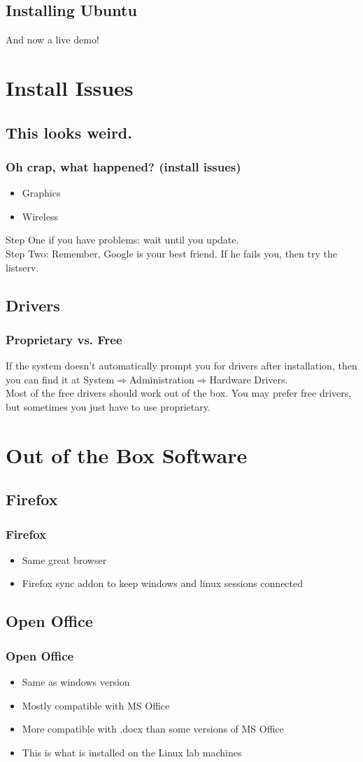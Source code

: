 \documentclass[hyperref={pdfpagelabels=false}]{beamer}
\begin{document}
\subsection{Installing Ubuntu}
\frame
{
	And now a live demo!
}
\section{Install Issues}
\subsection{This looks weird.}
\frame
{
	\frametitle{Oh crap, what happened? (install issues)}
	\begin{itemize}
	\item{Graphics}
	\item{Wireless}
	\end{itemize}
	Step One if you have problems: wait until you update.\\
	Step Two: Remember, Google is your best friend. If he fails you, then try the listserv.
}
\subsection{Drivers}
\frame
{
	\frametitle{Proprietary vs. Free}
	If the system doesn't automatically prompt you for drivers after installation, then you can find it at System$\Rightarrow$Administration$\Rightarrow$Hardware Drivers. \\
	Most of the free drivers should work out of the box. You may prefer free drivers, but sometimes you just have to use proprietary.
}
\section{Out of the Box Software}
\subsection{Firefox}
\frame
{
    \frametitle{Firefox}
    \begin{itemize}
    \item{Same great browser}
    \item{Firefox sync addon to keep windows and linux sessions connected}
    \end{itemize}
}
\subsection{Open Office}
\frame
{
    \frametitle{Open Office}
    \begin{itemize}
    \item{Same as windows version}
    \item{Mostly compatible with MS Office}
    \item{More compatible with .docx than some versions of MS Office}
	\item{This is what is installed on the Linux lab machines}
    \end{itemize}
}
\end{document}
